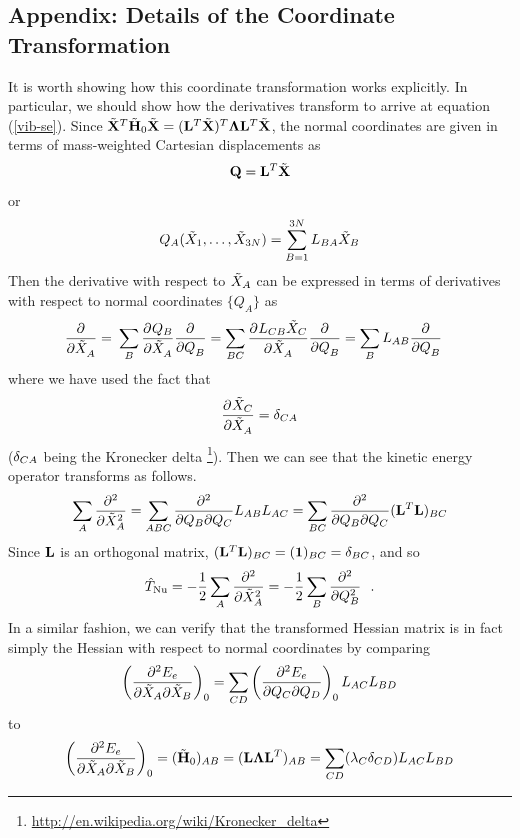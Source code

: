 \documentclass[11pt]{article}
\begin{document}
\newpage
\subsection{Appendix: Details of the Coordinate Transformation}
It is worth showing how this coordinate transformation works explicitly.
In particular, we should show how the derivatives transform to arrive at equation (\ref{vib-se}).
Since $\tilde{\mathbf{X}}^T\tilde{\mathbf{H}}_0\tilde{\mathbf{X}}=(\mathbf{L}^T\tilde{\mathbf{X}})^T\bm{\Lambda}\mathbf{L}^T\tilde{\mathbf{X}}$, the normal coordinates are given in terms of mass-weighted Cartesian displacements as
\begin{align*}
	\mathbf{Q}
=
	\mathbf{L}^T\tilde{\mathbf{X}}
\end{align*}
or
\begin{align}
%
	Q_A(\tl{X}_1,\ld,\tl{X}_{3N})
=
\sum_{B=1}^{3N}
	L_{BA}
	\tl{X}_B
\end{align}
Then the derivative with respect to $\tilde{X}_A$ can be expressed in terms of derivatives with respect to normal coordinates $\{Q_A\}$ as
\begin{align}
\label{derivative-transform}
%
	\pd{}{}{\tl{X}_A}
=&\
\sum_B
	\pd{}{Q_B}{\tl{X}_A}\pd{}{}{Q_B}
=
\sum_{BC}
	\pd{}{L_{CB}\tl{X}_C}{\tl{X}_A}\pd{}{}{Q_B}
=
\sum_{B}
	L_{AB}\pd{}{}{Q_B}
\end{align}
where we have used the fact that
\begin{align*}
 \dfrac{ \partial^{} \tilde{X}_C }{\partial \tilde{X}_A ^{}}=\delta_{CA}
\end{align*}
($\delta_{CA}$ being the Kronecker delta \footnote{\url{http://en.wikipedia.org/wiki/Kronecker_delta}}).
Then we can see that the kinetic energy operator transforms as follows.
\begin{align*}
\sum_A
	 \dfrac{ \partial^{2}  }{\partial \tilde{X}_A ^{2}}
=
\sum_{ABC}
	\dfrac{\partial^2}{\partial Q_B\partial Q_C}
	L_{AB}L_{AC}
=
\sum_{BC}
	\dfrac{\partial^2}{\partial Q_B\partial Q_C}
	(\mathbf{L}^T\mathbf{L})_{BC}
\end{align*}
Since $\mathbf{L}$ is an orthogonal matrix, $(\mathbf{L}^T\mathbf{L})_{BC}=(\mathbf{1})_{BC}=\delta_{BC}$, and so
\begin{align}
%
	\op{T}_\Nu
=
-\fr{1}{2}\sum_A
	\pd{2}{}{\tl{X}_A}
=
-\fr{1}{2}\sum_B
	\pd{2}{}{Q_B} \ \ .
\end{align}
In a similar fashion, we can verify that the transformed Hessian matrix is in fact simply the Hessian with respect to normal coordinates by comparing
\begin{align*}
%
	\pr{\fr{\pt^2E_e}{\pt\tl{X}_A\pt\tl{X}_B}}_0
=
\sum_{CD}
	\pr{\fr{\pt^2E_e}{\pt Q_C\pt Q_D}}_0
	L_{AC}L_{BD}
\end{align*}
to
\begin{align*}
%
	\pr{\fr{\pt^2E_e}{\pt\tl{X}_A\pt\tl{X}_B}}_0
=
	(\tl{\bo{H}}_0)_{AB}
=
	(\bo{L}\bm\La\bo{L}^T)_{AB}
=
	\sum_{CD}
	(\la_C\d_{CD})L_{AC}L_{BD}
\end{align*}
\end{document}
